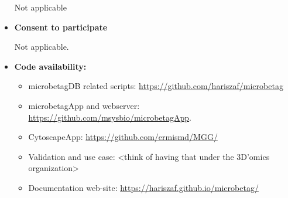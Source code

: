 \documentclass[sn-mathphys,Numbered, lineno]{sn-jnl}  %
\theoremstyle{thmstyleone}%
\theoremstyle{thmstyletwo}%
\theoremstyle{thmstylethree}%
\begin{document}
\begin{itemize}
            Not applicable

        \item \textbf{Consent to participate}
        
            Not applicable.

        \item \textbf{Code availability: }

            \begin{itemize}
                \item microbetagDB related scripts: \href{https://github.com/hariszaf/microbetag}{https://github.com/hariszaf/microbetag}
                \item microbetagApp and webserver: \href{https://github.com/msysbio/microbetagApp}{https://github.com/msysbio/microbetagApp}.
                \item CytoscapeApp: \href{https://github.com/ermismd/MGG/}{https://github.com/ermismd/MGG/}
                \item Validation and use case: <think of having that under the 3D'omics organization> 
                \item Documentation web-site: \href{https://hariszaf.github.io/microbetag/}{https://hariszaf.github.io/microbetag/}
            \end{itemize}

    \end{itemize}
\end{document}
